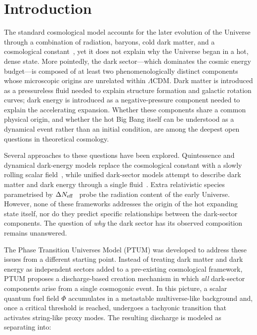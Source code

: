 \documentclass[epj]{svjour}
\begin{document}
\section{Introduction}
\label{sec:intro}

The standard cosmological model accounts for the later evolution of
the Universe through a combination of radiation, baryons, cold dark
matter, and a cosmological constant~\cite{Planck2018params}, yet it
does not explain why the Universe began in a hot, dense state. More
pointedly, the dark sector---which dominates the cosmic energy
budget---is composed of at least two phenomenologically distinct
components whose microscopic origins are unrelated within
$\Lambda$CDM. Dark matter is introduced as a pressureless fluid
needed to explain structure formation and galactic rotation curves;
dark energy is introduced as a negative-pressure component needed to
explain the accelerating expansion. Whether these components share a
common physical origin, and whether the hot Big Bang itself can be
understood as a dynamical event rather than an initial condition, are
among the deepest open questions in theoretical cosmology.

Several approaches to these questions have been explored. Quintessence
and dynamical dark-energy models replace the cosmological constant
with a slowly rolling scalar field~\cite{RatraPeebles,Caldwell1998},
while unified dark-sector models attempt to describe dark matter and
dark energy through a single fluid~\cite{Kamenshchik2001,Bento2002}.
Extra relativistic species parametrised by
$\Delta N_{\rm eff}$~\cite{Mangano2005,Cyburt2016} probe the
radiation content of the early Universe. However, none of these
frameworks addresses the origin of the hot expanding state itself, nor
do they predict specific relationships between the dark-sector
components. The question of \emph{why} the dark sector has its
observed composition remains unanswered.

The Phase Transition Universes Model (PTUM) was developed to address
these issues from a different starting point. Instead of treating dark
matter and dark energy as independent sectors added to a pre-existing
cosmological framework, PTUM proposes a discharge-based creation
mechanism in which \emph{all} dark-sector components arise from a
single cosmogonic event. In this picture, a scalar quantum fuel field
$\Phi$ accumulates in a metastable multiverse-like background and,
once a critical threshold is reached, undergoes a tachyonic transition
that activates string-like proxy modes. The resulting discharge is modeled as
separating into:
\end{document}
